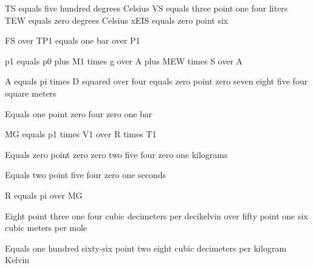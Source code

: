 TS equals five hundred degrees Celsius  
VS equals three point one four liters  
TEW equals zero degrees Celsius  
xEIS equals zero point six  

FS over TP1 equals one bar over P1  

p1 equals p0 plus M1 times g over A plus MEW times S over A  

A equals pi times D squared over four equals zero point zero seven eight five four square meters  

Equals one point zero four zero one bar  

MG equals p1 times V1 over R times T1  

Equals zero point zero zero two five four zero one kilograms  

Equals two point five four zero one seconds  

R equals pi over MG  

Eight point three one four cubic decimeters per decikelvin over fifty point one six cubic meters per mole  

Equals one hundred sixty-six point two eight cubic decimeters per kilogram Kelvin